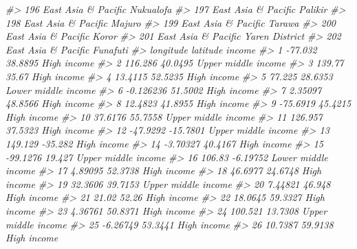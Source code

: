\documentclass[
  xelatex, ja=standard]{bxjsbook}
\newenvironment{Shaded}{\begin{snugshade}}{\end{snugshade}}
\newcommand{\CommentTok}[1]{\textcolor[rgb]{0.56,0.35,0.01}{\textit{#1}}}
\theoremstyle{definition}
\theoremstyle{definition}
\theoremstyle{definition}
\theoremstyle{definition}
\theoremstyle{remark}
\begin{document}
\begin{Shaded}
\begin{Highlighting}[]
\CommentTok{\#\textgreater{} 196        East Asia \& Pacific          Nuku\textquotesingle{}alofa}
\CommentTok{\#\textgreater{} 197        East Asia \& Pacific             Palikir}
\CommentTok{\#\textgreater{} 198        East Asia \& Pacific              Majuro}
\CommentTok{\#\textgreater{} 199        East Asia \& Pacific              Tarawa}
\CommentTok{\#\textgreater{} 200        East Asia \& Pacific               Koror}
\CommentTok{\#\textgreater{} 201        East Asia \& Pacific      Yaren District}
\CommentTok{\#\textgreater{} 202        East Asia \& Pacific            Funafuti}
\CommentTok{\#\textgreater{}      longitude   latitude              income}
\CommentTok{\#\textgreater{} 1      {-}77.032    38.8895         High income}
\CommentTok{\#\textgreater{} 2      116.286    40.0495 Upper middle income}
\CommentTok{\#\textgreater{} 3       139.77      35.67         High income}
\CommentTok{\#\textgreater{} 4      13.4115    52.5235         High income}
\CommentTok{\#\textgreater{} 5       77.225    28.6353 Lower middle income}
\CommentTok{\#\textgreater{} 6    {-}0.126236    51.5002         High income}
\CommentTok{\#\textgreater{} 7      2.35097    48.8566         High income}
\CommentTok{\#\textgreater{} 8      12.4823    41.8955         High income}
\CommentTok{\#\textgreater{} 9     {-}75.6919    45.4215         High income}
\CommentTok{\#\textgreater{} 10     37.6176    55.7558 Upper middle income}
\CommentTok{\#\textgreater{} 11     126.957    37.5323         High income}
\CommentTok{\#\textgreater{} 12    {-}47.9292   {-}15.7801 Upper middle income}
\CommentTok{\#\textgreater{} 13     149.129    {-}35.282         High income}
\CommentTok{\#\textgreater{} 14    {-}3.70327    40.4167         High income}
\CommentTok{\#\textgreater{} 15    {-}99.1276     19.427 Upper middle income}
\CommentTok{\#\textgreater{} 16      106.83   {-}6.19752 Lower middle income}
\CommentTok{\#\textgreater{} 17     4.89095    52.3738         High income}
\CommentTok{\#\textgreater{} 18     46.6977    24.6748         High income}
\CommentTok{\#\textgreater{} 19     32.3606    39.7153 Upper middle income}
\CommentTok{\#\textgreater{} 20     7.44821     46.948         High income}
\CommentTok{\#\textgreater{} 21       21.02      52.26         High income}
\CommentTok{\#\textgreater{} 22     18.0645    59.3327         High income}
\CommentTok{\#\textgreater{} 23     4.36761    50.8371         High income}
\CommentTok{\#\textgreater{} 24     100.521    13.7308 Upper middle income}
\CommentTok{\#\textgreater{} 25    {-}6.26749    53.3441         High income}
\CommentTok{\#\textgreater{} 26     10.7387    59.9138         High income}

\end{Highlighting}
\end{Shaded}
\end{document}
